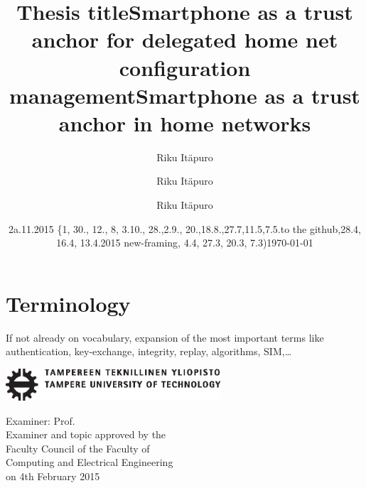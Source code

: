 \documentclass[12pt,a4paper,english]{tutthesis}
\author{Riku Itäpuro}
\title{Thesis title}      %
\author{Riku Itäpuro}
\title{Smartphone as a trust anchor for delegated home net configuration management}
\author{Riku Itäpuro}
\date{2a.11.2015 \{1, 30., 12., 8, 3.10., 28.,2.9., 20.,18.8.,27.7,11.5,7.5.to the github,28.4, 16.4, 13.4.2015 new-framing, 4.4, 27.3,  20.3, 7.3)}
\title{Smartphone as a trust anchor in home networks}
\begin{document}
\maketitle



\chapter*{Terminology}
\markboth{}{}                                %

If not already on vocabulary, expansion of the most important terms like
authentication, key-exchange, integrity, replay, algorithms, SIM,\ldots{}

\newpage             %

 \pagestyle{headings}
 \thispagestyle{empty}
\date\today
 \vspace*{-.5cm}\noindent
 \includegraphics[width=8cm]{tty_tut_logo}   %

\vspace{6.8cm}
\maketitle
\vspace{6.7cm} %

\begin{flushright}  
  \begin{minipage}[c]{6.8cm}
    \begin{spacing}{1.0}
      \textsf{Examiner: Prof. \@examiner}\\
      \textsf{Examiner and topic approved by the}\\ 
      \textsf{Faculty Council of the Faculty of} \\
      \textsf{Computing and Electrical Engineering} \\
      \textsf{on 4th February 2015}\\
    \end{spacing}
  \end{minipage}
\end{flushright}
\end{document}
